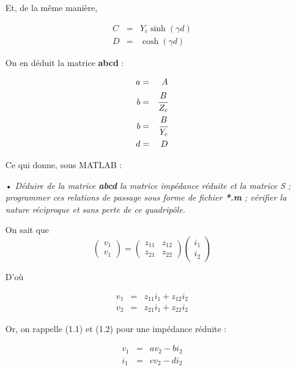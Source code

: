 \documentclass[10pt]{article}
\begin{document}
\begin{itemize}
        Et, de la même manière,

        \begin{eqnarray}
            C &=& Y_c \sinh(\gamma d) \\
            D &=& \cosh(\gamma d)
        \end{eqnarray}

        On en déduit la matrice \textbf{abcd} :

        \begin{eqnarray}
            a &=& A \\
            b &=& \cfrac{B}{Z_c} \\
            b &=& \cfrac{B}{Y_c} \\
            d &=& D
        \end{eqnarray}

        Ce qui donne, sous MATLAB :

    \item[•] \textit{Déduire de la matrice \textbf{abcd} la matrice impédance réduite et la matrice S ; programmer ces relations de passage sous forme de fichier \textbf{*.m} ; vérifier la nature réciproque et sans perte de ce quadripôle.}

        On sait que
        \[
            \begin{pmatrix}
                v_1 \\
                v_1
            \end{pmatrix}
            =
            \begin{pmatrix}
                z_{11} & z_{12} \\
                z_{21} & z_{22}
            \end{pmatrix}
            \begin{pmatrix}
                i_1 \\
                i_2
            \end{pmatrix}
        \]

        D'où

        \begin{eqnarray}
            v_1 &=& z_{11} i_1 + z_{12} i_2 \\
            v_2 &=& z_{21} i_1 + z_{22} i_2
        \end{eqnarray}

        Or, on rappelle (1.1) et (1.2) pour une impédance réduite :

        \begin{eqnarray}
            v_1 &=& a v_2 - b i_2 \\
            i_1 &=& c v_2 - d i_2
        \end{eqnarray}


\end{itemize}
\end{document}
